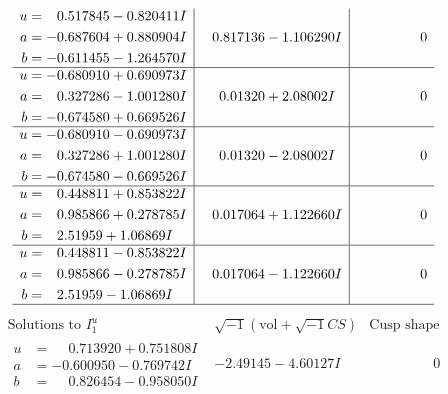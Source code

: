 \documentclass[1p]{elsarticle_modified}
\theoremstyle{definition}
\newcommand{\I}{\sqrt{-1}}
\begin{document}
$$\begin{array}{c|c|c}
\begin{aligned}
u &= \phantom{-}0.517845 - 0.820411 I \\
a &= -0.687604 + 0.880904 I \\
b &= -0.611455 - 1.264570 I\end{aligned}
 & \phantom{-}0.817136 - 1.106290 I & \phantom{-0.000000 } 0 \\ \hline\begin{aligned}
u &= -0.680910 + 0.690973 I \\
a &= \phantom{-}0.327286 - 1.001280 I \\
b &= -0.674580 + 0.669526 I\end{aligned}
 & \phantom{-}0.01320 + 2.08002 I & \phantom{-0.000000 } 0 \\ \hline\begin{aligned}
u &= -0.680910 - 0.690973 I \\
a &= \phantom{-}0.327286 + 1.001280 I \\
b &= -0.674580 - 0.669526 I\end{aligned}
 & \phantom{-}0.01320 - 2.08002 I & \phantom{-0.000000 } 0 \\ \hline\begin{aligned}
u &= \phantom{-}0.448811 + 0.853822 I \\
a &= \phantom{-}0.985866 + 0.278785 I \\
b &= \phantom{-}2.51959 + 1.06869 I\end{aligned}
 & \phantom{-}0.017064 + 1.122660 I & \phantom{-0.000000 } 0 \\ \hline\begin{aligned}
u &= \phantom{-}0.448811 - 0.853822 I \\
a &= \phantom{-}0.985866 - 0.278785 I \\
b &= \phantom{-}2.51959 - 1.06869 I\end{aligned}
 & \phantom{-}0.017064 - 1.122660 I & \phantom{-0.000000 } 0\\
 \hline 
 \end{array}$$\newpage$$\begin{array}{c|c|c}  
\text{Solutions to }I^u_{1}& \I (\text{vol} + \sqrt{-1}CS) & \text{Cusp shape}\\
 \hline 
\begin{aligned}
u &= \phantom{-}0.713920 + 0.751808 I \\
a &= -0.600950 - 0.769742 I \\
b &= \phantom{-}0.826454 - 0.958050 I\end{aligned}
 & -2.49145 - 4.60127 I & \phantom{-0.000000 } 0 \\ \hline\begin{aligned}

\end{aligned}
\end{array}$$
\end{document}
